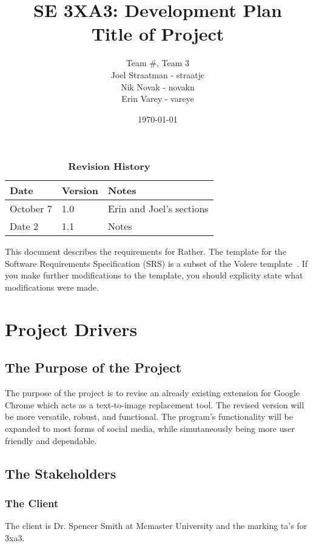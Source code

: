 \documentclass[12pt, titlepage]{article}
\title{SE 3XA3: Development Plan\\Title of Project}
\author{Team \#, Team 3
		\\ Joel Straatman - straatjc
		\\ Nik Novak - novakn
		\\ Erin Varey - vareye
}
\date{\today}
\begin{document}
\maketitle

\tableofcontents
\listoftables
\listoffigures

\begin{table}[bp]
\caption{\bf Revision History}
\begin{tabularx}{\textwidth}{p{3cm}p{2cm}X}
\toprule {\bf Date} & {\bf Version} & {\bf Notes}\\
\midrule
October 7 & 1.0 &  Erin and Joel's sections\\
Date 2 & 1.1 & Notes\\
\bottomrule
\end{tabularx}
\end{table}

\newpage


This document describes the requirements for Rather. The template for the Software
Requirements Specification (SRS) is a subset of the Volere
template~\citep{RobertsonAndRobertson2012}.  If you make further modifications
to the template, you should explicity state what modifications were made.

\section{Project Drivers}

\subsection{The Purpose of the Project}
The purpose of the project is to revise an already existing extension for Google Chrome which acts as a text-to-image replacement tool. The revised version will be more versatile, robust, and functional. The program's functionality will be expanded to most forms of social media, while simutaneously being more user friendly and dependable. 

\subsection{The Stakeholders}

\subsubsection{The Client}
The client is Dr. Spencer Smith at Mcmaster University and the marking ta's for 3xa3. 
\end{document}
